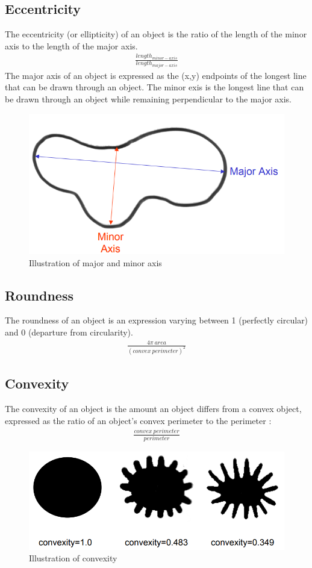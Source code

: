 \documentclass[letterpaper]{article}
\begin{document}
{\subsection{Eccentricity}
The eccentricity (or ellipticity) of an object is the ratio of the length of the minor axis to the length of the major axis. 
\begin{eqnarray*}
\frac {length_{minor-axis}} {length_{major-axis}}
\end{eqnarray*}
The major axis of an object is expressed as the (x,y) endpoints of the longest line that can be drawn through an object. The minor exis is the longest line that can be drawn through an object while remaining perpendicular to the major axis. \cite{Wirth2004-li}
\begin{figure}[H]
	\centering
	\includegraphics[width=0.4\linewidth]{./figures/major-minor-axis.png}
	\caption{Illustration of major and minor axis \protect\cite{Wirth2004-li} }
	\label{fig:major-minor}
\end{figure}

\subsection{Roundness}
The roundness of an object is an expression varying between 1 (perfectly circular) and 0 (departure from circularity).
\begin{eqnarray*}
\frac {4 \pi\ area} {(convex\ perimeter)^2}
\end{eqnarray*}


\subsection{Convexity}
The convexity of an object is the amount an object differs from a convex object, expressed as the ratio of an object's convex perimeter to the perimeter \cite{Wirth2004-li}:
\begin{eqnarray*}
\frac {convex\ perimeter} {perimeter}
\end{eqnarray*}
\begin{figure}[H]
	\centering
	\includegraphics[width=0.4\linewidth]{./figures/convexity.png}
	\caption{Illustration of convexity \protect\cite{Wirth2004-li} }
	\label{fig:convexity}
\end{figure}

}
\end{document}
